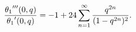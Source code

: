 \[\frac{\mathop{\theta_{1}\/}\nolimits'''\!\left(0,q\right)}{\mathop{\theta_{1}%
\/}\nolimits'\!\left(0,q\right)}=-1+24\sum_{n=1}^{\infty}\frac{q^{2n}}{(1-q^{2%
n})^{2}}.\]